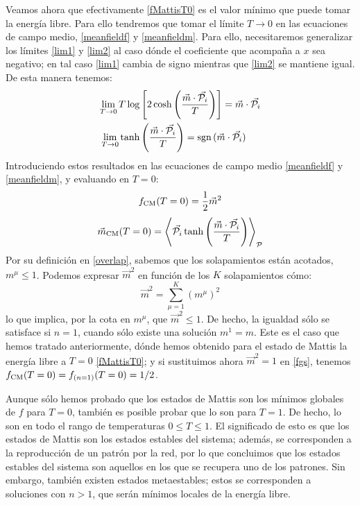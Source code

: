 \documentclass[titlepage,12pt]{article}
\numberwithin{equation}{section}
\begin{document}
	Veamos ahora que efectivamente \eqref{fMattisT0} es el valor mínimo que puede tomar la energía libre. Para ello tendremos que tomar el límite $T\rightarrow0$ en las ecuaciones de campo medio, \eqref{meanfieldf} y \eqref{meanfieldm}. Para ello, necesitaremos generalizar los límites \eqref{lim1} y \eqref{lim2} al caso dónde el coeficiente que acompaña a $x$ sea negativo; en tal caso \eqref{lim1} cambia de signo mientras que \eqref{lim2} se mantiene igual. De esta manera tenemos:
	\begin{align*}
	\lim_{T\rightarrow0}T\log&\left[2\cosh\left(\frac{\vec{m}\cdot\vec{\mathcal{P}_i}}{T}\right)\right]=\vec{m}\cdot\vec{\mathcal{P}_i} \\
	\lim_{T\rightarrow0}\tanh&\left(\frac{\vec{m}\cdot\vec{\mathcal{P}_i}}{T}\right)=\textnormal{sgn}\,(\vec{m}\cdot\vec{\mathcal{P}_i})
	\end{align*}
	Introduciendo estos resultados en las ecuaciones de campo medio \eqref{meanfieldf} y \eqref{meanfieldm}, y evaluando en $T=0$:
	\begin{equation}
	f_{\textnormal{CM}}(T=0)=\frac{1}{2}\vec{m}^2
	\label{fgs}
	\end{equation}
	\begin{equation}
	\vec{m}_{\textnormal{CM}}(T=0)=\left<\vec{\mathcal{P}_i}\tanh\left(\frac{\vec{m}\cdot\vec{\mathcal{P}_i}}{T}\right)\right>_{\mathcal{P}}
	\label{mgs}
	\end{equation}
	Por su definición en \eqref{overlap}, sabemos que los solapamientos están acotados, $m^\mu\leq1$. Podemos expresar $\vec{m}^2$ en función de los $K$ solapamientos cómo:
	\begin{displaymath}
	\vec{m}^2=\sum_{\mu=1}^K (m^\mu)^2
	\end{displaymath}
	lo que implica, por la cota en $m^\mu$, que $\vec{m}^2\leq1$. De hecho, la igualdad sólo se satisface si $n=1$, cuando sólo existe una solución $m^1=m$. Este es el caso que hemos tratado anteriormente, dónde hemos obtenido para el estado de Mattis la energía libre a $T=0$ \eqref{fMattisT0}; y si sustituimos ahora $\vec{m}^2=1$ en \eqref{fgs}, tenemos $f_{\textnormal{CM}}(T=0)=f_{(n=1)}(T=0)=1/2$.
	
	Aunque sólo hemos probado que los estados de Mattis son los mínimos globales de $f$ para $T=0$, también es posible probar que lo son para $T=1$. De hecho, lo son en todo el rango de temperaturas $0\leq T\leq1$. El significado de esto es que los estados de Mattis son los estados estables del sistema; además, se corresponden a la reproducción de un patrón por la red, por lo que concluimos que los estados estables del sistema son aquellos en los que se recupera uno de los patrones. Sin embargo, también existen estados metaestables; estos se corresponden a soluciones con $n>1$, que serán mínimos locales de la energía libre.
\end{document}
